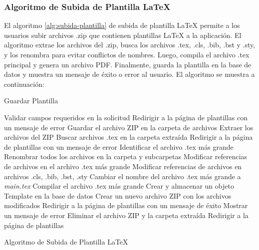 \subsubsection{Algoritmo de Subida de Plantilla LaTeX}
El algoritmo \ref{alg:subida-plantilla} de subida de plantilla LaTeX permite a los usuarios subir archivos .zip que contienen plantillas LaTeX a la aplicación. El algoritmo extrae los archivos del .zip, busca los archivos .tex, .cls, .bib, .bst y .sty, y los renombra para evitar conflictos de nombres. Luego, compila el archivo .tex principal y genera un archivo PDF. Finalmente, guarda la plantilla en la base de datos y muestra un mensaje de éxito o error al usuario. El algoritmo se muestra a continuación:

\begin{algorithm}
    \caption{Guardar Plantilla}
    \begin{algorithmic}[1]
        \State Validar campos requeridos en la solicitud
            \State Redirigir a la página de plantillas con un mensaje de error
        \Else
            \State Guardar el archivo ZIP en la carpeta de archivos
            \State Extraer los archivos del ZIP
                \State Buscar archivos .tex en la carpeta extraída
                    \State Redirigir a la página de plantillas con un mensaje de error
                \Else
                    \State Identificar el archivo .tex más grande
                    \State Renombrar todos los archivos en la carpeta y subcarpetas
                    \State Modificar referencias de archivos en el archivo .tex más grande
                    \State Modificar referencias de archivos en archivos .cls, .bib, .bst, .sty
                    \State Cambiar el nombre del archivo .tex más grande a \textit{main.tex}
                    \State Compilar el archivo .tex más grande
                        \State Crear y almacenar un objeto Template en la base de datos
                        \State Crear un nuevo archivo ZIP con los archivos modificados
                        \State Redirigir a la página de plantillas con un mensaje de éxito
                    \Else
                        \State Mostrar un mensaje de error
                        \State Eliminar el archivo ZIP y la carpeta extraída
                        \State Redirigir a la página de plantillas
                    \EndIf
                \EndIf
            \EndIf
        \EndIf
    \EndProcedure
    \end{algorithmic}
    \caption{Algoritmo de Subida de Plantilla LaTeX}
    \label{alg:subida-plantilla}
\end{algorithm}

